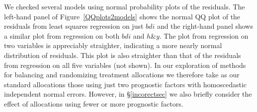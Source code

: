 \documentclass[number,12pt,review]{elsarticle}
\begin{document}
\begin{table}[ht]
\end{table}

We checked several models using normal probability plots of the residuals.  The left-hand panel of Figure~\ref{QQplots2models} shows the normal QQ plot of the residuals from least squares regression on just  $bdi$ and the right-hand panel shows a similar plot from regression on both $bdi$ and $h\&y$.
The plot from regression on two variables is appreciably straighter, indicating a more nearly normal distribution of residuals. This plot is also straighter than that of the residuals from regression on all five variables (not shown). In our exploration of methods for balancing and randomizing treatment allocations we therefore take as our standard allocations those using just two prognostic factors with homoscedastic independent normal errors. However, in \S\ref{incorectsec} we also briefly consider the effect of allocations using fewer or more prognostic factors.
\end{document}

